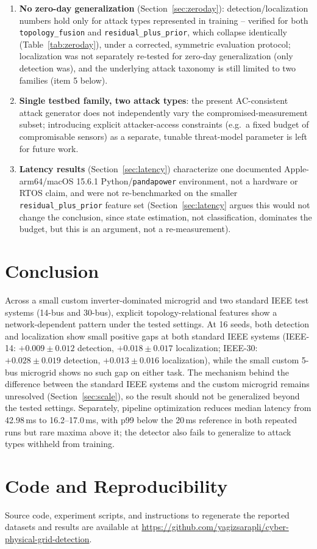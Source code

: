 \documentclass[conference]{IEEEtran}
\begin{document}
\begin{enumerate}
\item \textbf{No zero-day generalization} (Section~\ref{sec:zeroday}): detection/localization numbers hold only for attack types represented in training -- verified for both \texttt{topology\_fusion} and \texttt{residual\_plus\_prior}, which collapse identically (Table~\ref{tab:zeroday}), under a corrected, symmetric evaluation protocol; localization was not separately re-tested for zero-day generalization (only detection was), and the underlying attack taxonomy is still limited to two families (item 5 below).
\item \textbf{Single testbed family, two attack types}: the present AC-consistent attack generator does not independently vary the compromised-measurement subset; introducing explicit attacker-access constraints (e.g.\ a fixed budget of compromisable sensors) as a separate, tunable threat-model parameter is left for future work.
\item \textbf{Latency results} (Section~\ref{sec:latency}) characterize one documented Apple-arm64/macOS 15.6.1 Python/\texttt{pandapower} environment, not a hardware or RTOS claim, and were not re-benchmarked on the smaller \texttt{residual\_plus\_prior} feature set (Section~\ref{sec:latency} argues this would not change the conclusion, since state estimation, not classification, dominates the budget, but this is an argument, not a re-measurement).
\end{enumerate}

\section{Conclusion}

Across a small custom inverter-dominated microgrid and two standard IEEE test systems (14-bus and 30-bus), explicit topology-relational features show a network-dependent pattern under the tested settings. At 16 seeds, both detection and localization show small positive gaps at both standard IEEE systems (IEEE-14: $+0.009\pm0.012$ detection, $+0.018\pm0.017$ localization; IEEE-30: $+0.028\pm0.019$ detection, $+0.013\pm0.016$ localization), while the small custom 5-bus microgrid shows no such gap on either task. The mechanism behind the difference between the standard IEEE systems and the custom microgrid remains unresolved (Section~\ref{sec:scale}), so the result should not be generalized beyond the tested settings. Separately, pipeline optimization reduces median latency from 42.98\,ms to 16.2--17.0\,ms, with p99 below the 20\,ms reference in both repeated runs but rare maxima above it; the detector also fails to generalize to attack types withheld from training.

\section*{Code and Reproducibility}
Source code, experiment scripts, and instructions to regenerate the reported datasets and results are available at \url{https://github.com/yagizsarapli/cyber-physical-grid-detection}.



\end{document}
